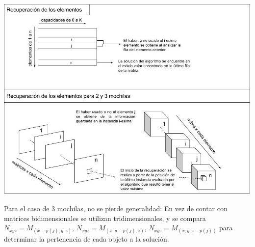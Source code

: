   \vspace*{0.3cm} \vspace*{0.3cm}
  \begin{center}
 \includegraphics[scale=0.6]{./EJ3/dibujo-recuperacion.jpg}
  \end{center}
  \vspace*{0.3cm}

 Para el caso de 3 mochilas, no se pierde generalidad: En vez de contar con matrices bidimensionales se utilizan tridimensionales, y se compara $N_{xyz} = M_{(x-p(j),y,z)}$, $N_{xyz} = M_{(x,y-p(j),z)}$, $N_{xyz} = M_{(x,y,z-p(j))}$ para determinar la pertenencia de cada objeto a la solución.     